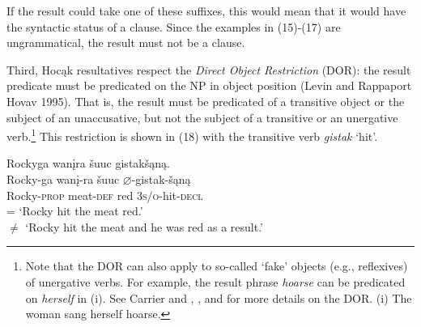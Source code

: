 \documentclass[output=paper]{LSP/langsci}
\begin{document}
\begin{exe}
\ex
\begin{xlist}



\end{xlist}
\end{exe}

If the result could take one of these suffixes, this would mean that it would have the syntactic status of a clause. Since the examples in (15)-(17) are ungrammatical, the result must not be a clause.

Third, Hocąk resultatives respect the \textit{Direct Object Restriction} (DOR): the result predicate must be predicated on the NP in object position (Levin and Rappaport Hovav 1995). That is, the result must be predicated of a transitive object or the subject of an unaccusative, but not the subject of a transitive or an unergative verb.\footnote{Note that the DOR can also apply to so-called `fake' objects (e.g., reflexives) of unergative verbs. For example, the result phrase \textit{hoarse} can be predicated on \textit{herself} in (i). See Carrier and \citet{Randall1992}, \citet{Li1999}, and \citet{Wechsler2005} for more details on the DOR. (i) The woman sang herself hoarse.} This restriction is shown in (18) with the transitive verb \textit{gistak} `hit'.

\begin{exe}

\ex \glll Rockyga wanįra šuuc gistakšąną.\\ 
Rocky-ga wanį-ra šuuc {$\varnothing$}-gistak-šąną\\
Rocky-\textsc{prop} meat-\textsc{def} red \textsc{3s/o}-hit-\textsc{decl}\\
\glt = `Rocky hit the meat red.' \vspace{-3pt} \\ 
$\not=$ `Rocky hit the meat  and he was red as a result.'

\end{exe}
\end{document}
